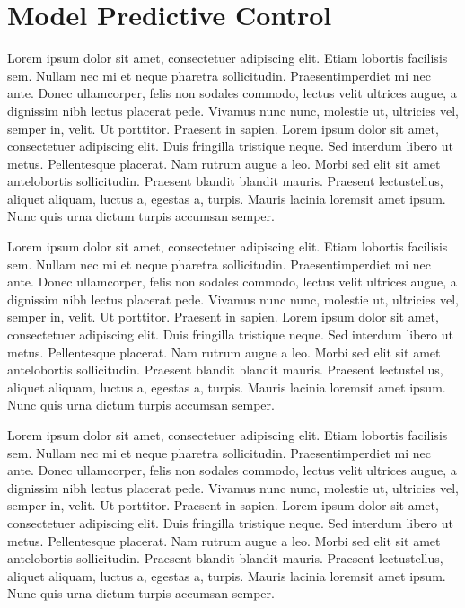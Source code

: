 \section{Model Predictive Control}

Lorem ipsum dolor sit amet, consectetuer adipiscing elit. Etiam lobortis facilisis sem. Nullam nec mi et neque pharetra sollicitudin. Praesentimperdiet mi nec ante. Donec ullamcorper, felis non sodales commodo, lectus velit ultrices augue, a dignissim nibh lectus placerat pede. Vivamus nunc nunc, molestie ut, ultricies vel, semper in, velit. Ut porttitor. Praesent in sapien. Lorem ipsum dolor sit amet, consectetuer adipiscing elit. Duis fringilla tristique neque. Sed interdum libero ut metus. Pellentesque placerat. Nam rutrum augue a leo. Morbi sed elit sit amet antelobortis sollicitudin. Praesent blandit blandit mauris. Praesent lectustellus, aliquet aliquam, luctus a, egestas a, turpis. Mauris lacinia loremsit amet ipsum. Nunc quis urna dictum turpis accumsan semper.

Lorem ipsum dolor sit amet, consectetuer adipiscing elit. Etiam lobortis facilisis sem. Nullam nec mi et neque pharetra sollicitudin. Praesentimperdiet mi nec ante. Donec ullamcorper, felis non sodales commodo, lectus velit ultrices augue, a dignissim nibh lectus placerat pede. Vivamus nunc nunc, molestie ut, ultricies vel, semper in, velit. Ut porttitor. Praesent in sapien. Lorem ipsum dolor sit amet, consectetuer adipiscing elit. Duis fringilla tristique neque. Sed interdum libero ut metus. Pellentesque placerat. Nam rutrum augue a leo. Morbi sed elit sit amet antelobortis sollicitudin. Praesent blandit blandit mauris. Praesent lectustellus, aliquet aliquam, luctus a, egestas a, turpis. Mauris lacinia loremsit amet ipsum. Nunc quis urna dictum turpis accumsan semper.

Lorem ipsum dolor sit amet, consectetuer adipiscing elit. Etiam lobortis facilisis sem. Nullam nec mi et neque pharetra sollicitudin. Praesentimperdiet mi nec ante. Donec ullamcorper, felis non sodales commodo, lectus velit ultrices augue, a dignissim nibh lectus placerat pede. Vivamus nunc nunc, molestie ut, ultricies vel, semper in, velit. Ut porttitor. Praesent in sapien. Lorem ipsum dolor sit amet, consectetuer adipiscing elit. Duis fringilla tristique neque. Sed interdum libero ut metus. Pellentesque placerat. Nam rutrum augue a leo. Morbi sed elit sit amet antelobortis sollicitudin. Praesent blandit blandit mauris. Praesent lectustellus, aliquet aliquam, luctus a, egestas a, turpis. Mauris lacinia loremsit amet ipsum. Nunc quis urna dictum turpis accumsan semper.

